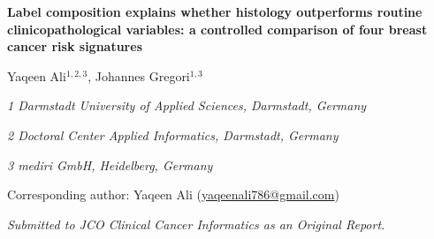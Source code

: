 \documentclass[11pt,a4paper]{article}
\begin{document}
\begin{center}
{\Large\bfseries Label composition explains whether histology outperforms routine clinicopathological variables: a controlled comparison of four breast cancer risk signatures\par}
\vspace{1em}
{\normalsize Yaqeen Ali$^{1,2,3}$, Johannes Gregori$^{1,3}$\par}
\vspace{0.4em}
{\small\itshape 1 Darmstadt University of Applied Sciences, Darmstadt, Germany\par}
{\small\itshape 2 Doctoral Center Applied Informatics, Darmstadt, Germany\par}
{\small\itshape 3 mediri GmbH, Heidelberg, Germany\par}
{\small Corresponding author: Yaqeen Ali (\href{mailto:yaqeenali786@gmail.com}{yaqeenali786@gmail.com})\par}
{\small\itshape Submitted to JCO Clinical Cancer Informatics as an Original Report.\par}
\end{center}
\vspace{0.6em}
\end{document}
